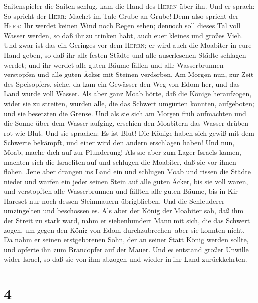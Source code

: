 Saitenspieler die Saiten schlug, kam die Hand des \textsc{Herrn} über
ihn.  Und er sprach: So spricht der \textsc{Herr}: Machet
im Tale Grube an Grube!  Denn also spricht der
\textsc{Herr}: Ihr werdet keinen Wind noch Regen sehen; dennoch soll
dieses Tal voll Wasser werden, so daß ihr zu trinken habt,
 auch euer kleines und großes Vieh. Und zwar ist das ein
Geringes vor dem \textsc{Herrn}; er wird auch die Moabiter in eure Hand
geben,  so daß ihr alle festen Städte und alle
auserlesenen Städte schlagen werdet; und ihr werdet alle guten Bäume
fällen und alle Wasserbrunnen verstopfen und alle guten Äcker mit
Steinen verderben.  Am Morgen nun, zur Zeit des
Speisopfers, siehe, da kam ein Gewässer den Weg von Edom her, und das
Land wurde voll Wasser.  Als aber ganz Moab hörte, daß
die Könige heraufzogen, wider sie zu streiten, wurden alle, die das
Schwert umgürten konnten, aufgeboten; und sie besetzten die Grenze.
 Und als sie sich am Morgen früh aufmachten und die Sonne
über dem Wasser aufging, erschien den Moabitern das Wasser drüben rot
wie Blut.  Und sie sprachen: Es ist Blut! Die Könige
haben sich gewiß mit dem Schwerte bekämpft, und einer wird den andern
erschlagen haben! Und nun, Moab, mache dich auf zur Plünderung!
 Als sie aber zum Lager Israels kamen, machten sich die
Israeliten auf und schlugen die Moabiter, daß sie vor ihnen flohen.
 Jene aber drangen ins Land ein und schlugen Moab und
rissen die Städte nieder und warfen ein jeder seinen Stein auf alle
guten Äcker, bis sie voll waren, und verstopften alle Wasserbrunnen und
fällten alle guten Bäume, bis in Kir-Hareset nur noch dessen Steinmauern
übrigblieben. Und die Schleuderer umzingelten und beschossen es.
 Als aber der König der Moabiter sah, daß ihm der Streit
zu stark ward, nahm er siebenhundert Mann mit sich, die das Schwert
zogen, um gegen den König von Edom durchzubrechen; aber sie konnten
nicht.  Da nahm er seinen erstgeborenen Sohn, der an
seiner Statt König werden sollte, und opferte ihn zum Brandopfer auf der
Mauer. Und es entstand großer Unwille wider Israel, so daß sie von ihm
abzogen und wieder in ihr Land zurückkehrten.

\hypertarget{section-3}{%
\section{4}\label{section-3}}

